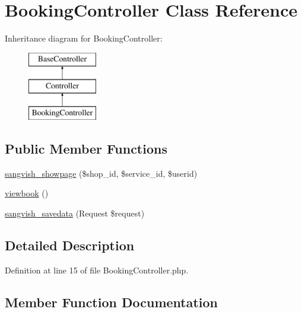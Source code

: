 \hypertarget{class_responsive_1_1_http_1_1_controllers_1_1_booking_controller}{}\section{Booking\+Controller Class Reference}
\label{class_responsive_1_1_http_1_1_controllers_1_1_booking_controller}
Inheritance diagram for Booking\+Controller\+:\begin{figure}[H]
\begin{center}
\leavevmode
\includegraphics[height=3.000000cm]{class_responsive_1_1_http_1_1_controllers_1_1_booking_controller}
\end{center}
\end{figure}
\subsection*{Public Member Functions}
\begin{DoxyCompactItemize}
\item 
\mbox{\hyperlink{class_responsive_1_1_http_1_1_controllers_1_1_booking_controller_ac4dbdfcb87b946eef72ff67ba43d73aa}{sangvish\+\_\+showpage}} (\$shop\+\_\+id, \$service\+\_\+id, \$userid)
\item 
\mbox{\hyperlink{class_responsive_1_1_http_1_1_controllers_1_1_booking_controller_a2086730473ed696bdcb41452a2c575e0}{viewbook}} ()
\item 
\mbox{\hyperlink{class_responsive_1_1_http_1_1_controllers_1_1_booking_controller_a63d8d498a130e9f530dd9de0247a0c74}{sangvish\+\_\+savedata}} (Request \$request)
\end{DoxyCompactItemize}


\subsection{Detailed Description}


Definition at line 15 of file Booking\+Controller.\+php.



\subsection{Member Function Documentation}
\mbox{\label{class_responsive_1_1_http_1_1_controllers_1_1_booking_controller_a63d8d498a130e9f530dd9de0247a0c74}} 
